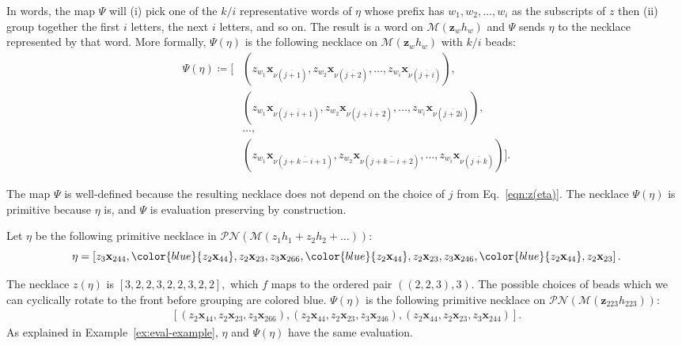 \documentclass[ALCO, Unicode]{cedram}
\begin{document}
In words, the map $\Psi$ will (i) pick one of the $k/i$ representative words of  $\eta$ whose prefix has $w_1, w_2, \ldots, w_i$ as the subscripts of $z$ then (ii) group together the first $i$ letters, the next $i$ letters, and so on. The result is a word on $\mathcal{M}(\mathbf{z}_wh_w)$ and $\Psi$ sends $\eta$ to the necklace represented by that word. More formally,  $\Psi(\eta)$ is the following necklace on $\mathcal{M}(\mathbf{z}_wh_w)$ with $k / i$ beads:
\begin{align*}
\Psi(\eta)  \coloneqq  \Bigg[&{\left(z_{w_1}\mathbf{x}_{\nu(\overline{j + 1})},z_{w_2}\mathbf{x}_{\nu(\overline{j + 2})}, \ldots, z_{w_i}\mathbf{x}_{\nu(\overline{j + i})} \right)},\\
&{\left(z_{w_1}\mathbf{x}_{\nu(\overline{j +i + 1})},z_{w_2}\mathbf{x}_{\nu(\overline{j +i + 2})}, \ldots, z_{w_i}\mathbf{x}_{\nu(\overline{j + 2i})} \right)},\\
& \ldots,\\
&{\left(z_{w_1}\mathbf{x}_{\nu(\overline{j + k - i + 1})},z_{w_2}\mathbf{x}_{\nu(\overline{j + k - i + 2})}, \ldots, z_{w_i}\mathbf{x}_{\nu(\overline{j + k})} \right)} \Bigg].  
\end{align*}

The map $\Psi$ is well-defined because the resulting necklace does not depend on the choice of $j$ from Eq.~\eqref{eqn:z(eta)}. The necklace $\Psi(\eta)$ is primitive because $\eta$ is, and $\Psi$ is evaluation preserving by construction.

\begin{exam}
Let $\eta$ be the following primitive necklace in $\mathscr{PN}\left(\mathcal{M}(z_1h_1 \! + \!  z_2h_2 \! + \! \ldots)\right)$:
\[\eta = \left[z_3\mathbf{x}_{244}, \color{blue}{z_2\mathbf{x}_{44}}\normalcolor, z_2\mathbf{x}_{23}, z_3\mathbf{x}_{266}, \color{blue}{z_2\mathbf{x}_{44}}\normalcolor, z_2\mathbf{x}_{23}, z_3\mathbf{x}_{246}, \color{blue}{z_2\mathbf{x}_{44}}\normalcolor,  z_2\mathbf{x}_{23} \right].\]

The necklace $z(\eta)$ is $[3, 2, 2, 3, 2, 2, 3, 2, 2],$ which $f$ maps to the ordered pair $\left((2, 2, 3), 3\right).$ The possible choices of beads which we can cyclically rotate to the front before grouping are colored blue. $\Psi(\eta)$ is the following primitive necklace on $\mathscr{PN}\left(\mathcal{M}\left(\mathbf{z}_{223}h_{223}\right)\right):$ 
\begin{align*}
    \left[\left(z_2\mathbf{x}_{44}, z_2\mathbf{x}_{23}, z_3\mathbf{x}_{266}\right), \left(z_2\mathbf{x}_{44}, z_2\mathbf{x}_{23}, z_3\mathbf{x}_{246}\right), \left(z_2\mathbf{x}_{44},  z_2\mathbf{x}_{23}, z_3\mathbf{x}_{244}\right)\right].
\end{align*}
As explained in Example~\ref{ex:eval-example}, $\eta$ and $\Psi(\eta)$ have the same evaluation.
\end{exam}
\end{document}
